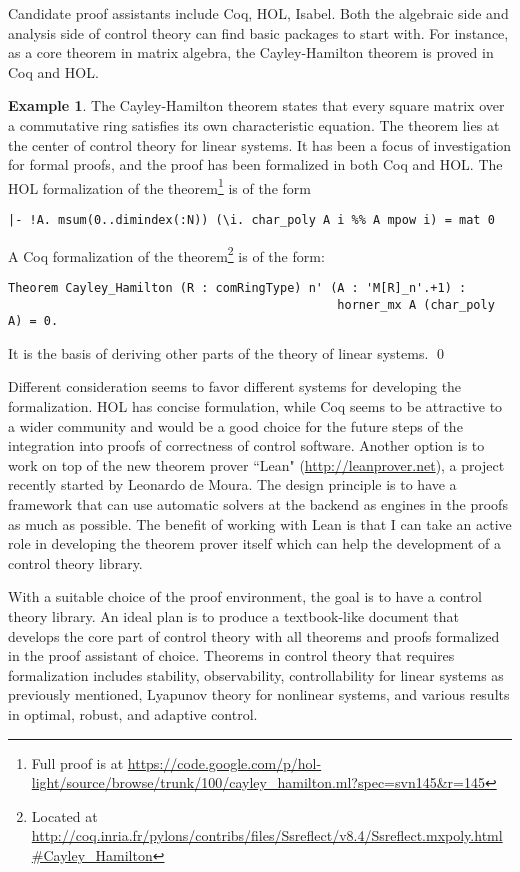 \documentclass[10pt]{article}
\theoremstyle{definition}
\newtheorem{example}{Example}[section]
\begin{document}
Candidate proof assistants include Coq, HOL, Isabel. Both the algebraic side and analysis side of control theory can find basic packages to start with. For instance, as a core theorem in matrix algebra, the Cayley-Hamilton theorem is proved in Coq and HOL.  
\begin{example}
The Cayley-Hamilton theorem states that every square matrix over a commutative ring satisfies its own characteristic equation. The theorem lies at the center of control theory for linear systems. It has been a focus of investigation for formal proofs, and the proof has been formalized in both Coq and HOL. 
The HOL formalization of the theorem\footnote{Full proof is at \url{https://code.google.com/p/hol-light/source/browse/trunk/100/cayley_hamilton.ml?spec=svn145&r=145}} is of the form
\begin{verbatim}
|- !A. msum(0..dimindex(:N)) (\i. char_poly A i %% A mpow i) = mat 0
\end{verbatim}
A Coq formalization of the theorem\footnote{Located at \url{http://coq.inria.fr/pylons/contribs/files/Ssreflect/v8.4/Ssreflect.mxpoly.html\#Cayley_Hamilton}} is of the form:
\begin{verbatim}
Theorem Cayley_Hamilton (R : comRingType) n' (A : 'M[R]_n'.+1) : 
                                              horner_mx A (char_poly A) = 0.
\end{verbatim}
It is the basis of deriving other parts of the theory of linear systems. \qed
\end{example}
Different consideration seems to favor different systems for developing the formalization. HOL has concise formulation, while Coq seems to be attractive to a wider community and would be a good choice for the future steps of the integration into proofs of correctness of control software. Another option is to work on top of the new theorem prover ``Lean" (\url{http://leanprover.net}), a project recently started by Leonardo de Moura. The design principle is to have a framework that can use automatic solvers at the backend as engines in the proofs as much as possible. The benefit of working with Lean is that I can take an active role in developing the theorem prover itself which can help the development of a control theory library. 

With a suitable choice of the proof environment, the goal is to have a control theory library. An ideal plan is to produce a textbook-like document that develops the core part of control theory with all theorems and proofs formalized in the proof assistant of choice. Theorems in control theory that requires formalization includes stability, observability, controllability for linear systems as previously mentioned, Lyapunov theory for nonlinear systems, and various results in optimal, robust, and adaptive control. 
\end{document}
